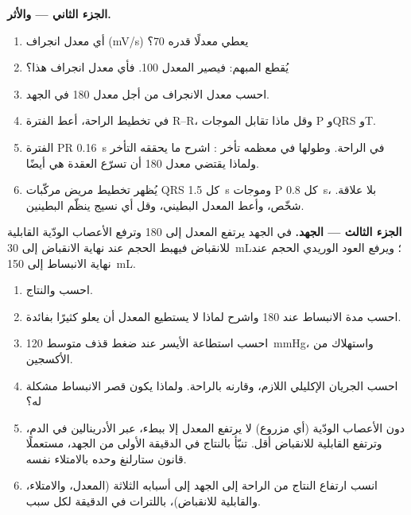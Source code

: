 \begin{problem}
\medskip
\noindent\textbf{الجزء الثاني ---  والأثر.}
\begin{enumerate}[resume]
  \item أي معدل انجراف (\unit{mV/s}) يعطي معدلًا قدره 70؟
  \item يُقطع المبهم: فيصير المعدل 100. فأي معدل انجراف
        هذا؟
  \item احسب معدل الانجراف من أجل معدل 180 في الجهد.
  \item في تخطيط الراحة، أعط الفترة R--R، وقل ماذا تقابل
        الموجات P وQRS وT.
  \item الفترة PR \qty{0.16}{s} في الراحة. وطولها في معظمه
        تأخر : اشرح ما يحققه التأخر
        ولماذا يقتضي معدل 180 أن تسرّع العقدة هي أيضًا.
  \item يُظهر تخطيط مريض مركّبات QRS كل \qty{1.5}{s} وموجات P
        كل \qty{0.8}{s}، بلا علاقة. شخّص، وأعط
        المعدل البطيني، وقل أي نسيج ينظّم
        البطينين.
\end{enumerate}

\medskip
\noindent\textbf{الجزء الثالث --- الجهد.}
في الجهد يرتفع المعدل إلى 180 وترفع الأعصاب الودّية
القابلية للانقباض فيهبط الحجم عند نهاية الانقباض إلى
\qty{30}{mL}؛ ويرفع العود الوريدي الحجم عند نهاية الانبساط إلى
\qty{150}{mL}.
\begin{enumerate}[resume]
  \item احسب   والنتاج.
  \item احسب مدة الانبساط عند 180 واشرح لماذا لا يستطيع
        المعدل أن يعلو كثيرًا بفائدة.
  \item احسب استطاعة  الأيسر عند ضغط قذف
        متوسط \qty{120}{mmHg}، واستهلاك  من
        الأكسجين.
  \item احسب الجريان الإكليلي اللازم، وقارنه بالراحة.
        ولماذا يكون قصر الانبساط مشكلة له؟
  \item دون الأعصاب الودّية (أي  مزروع) لا يرتفع
        المعدل إلا ببطء، عبر الأدرينالين في الدم، وترتفع
        القابلية للانقباض أقل. تنبّأ بالنتاج في الدقيقة الأولى
        من الجهد، مستعملًا قانون ستارلنغ وحده بالامتلاء نفسه.
  \item انسب ارتفاع النتاج من الراحة إلى الجهد إلى
        أسبابه الثلاثة (المعدل، والامتلاء، والقابلية للانقباض)، باللترات في
        الدقيقة لكل سبب.
\end{enumerate}


\end{problem}
